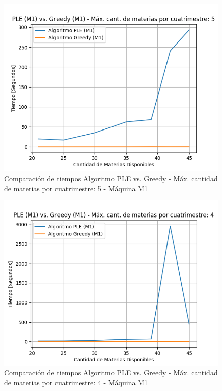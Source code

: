 \documentclass[a4paper]{article}
\begin{document}
\begin{figure}[H]
\centering
\includegraphics[scale=0.65]{Imagenes/m1_PLE_vs_GREEDY_max_mat_5.png}\par
\caption{Comparación de tiempos Algoritmo PLE vs. Greedy - Máx. cantidad de materias por cuatrimestre: 5 - Máquina M1}
\end{figure}

\begin{figure}[H]
\centering
\includegraphics[scale=0.65]{Imagenes/m1_PLE_vs_GREEDY_max_mat_4.png}\par
\caption{Comparación de tiempos Algoritmo PLE vs. Greedy - Máx. cantidad de materias por cuatrimestre: 4 - Máquina M1}
\end{figure}
\end{document}
